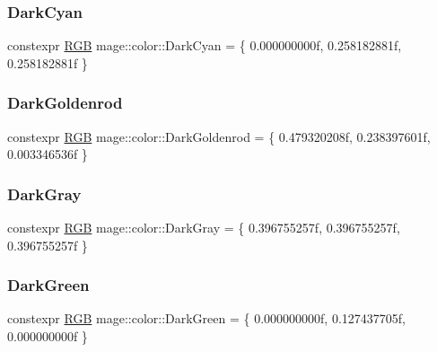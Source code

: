 \subsubsection{\texorpdfstring{Dark\+Cyan}{DarkCyan}}
{\footnotesize\ttfamily constexpr \hyperlink{structmage_1_1_r_g_b}{R\+GB} mage\+::color\+::\+Dark\+Cyan = \{ 0.\+000000000f, 0.\+258182881f, 0.\+258182881f \}}

\hypertarget{namespacemage_1_1color_a50ec8ddc7d55e5286b0b2f01ab690b2b}{}\label{namespacemage_1_1color_a50ec8ddc7d55e5286b0b2f01ab690b2b} 
\subsubsection{\texorpdfstring{Dark\+Goldenrod}{DarkGoldenrod}}
{\footnotesize\ttfamily constexpr \hyperlink{structmage_1_1_r_g_b}{R\+GB} mage\+::color\+::\+Dark\+Goldenrod = \{ 0.\+479320208f, 0.\+238397601f, 0.\+003346536f \}}

\hypertarget{namespacemage_1_1color_abe66674f72bdb34922b39b4ed1892159}{}\label{namespacemage_1_1color_abe66674f72bdb34922b39b4ed1892159} 
\subsubsection{\texorpdfstring{Dark\+Gray}{DarkGray}}
{\footnotesize\ttfamily constexpr \hyperlink{structmage_1_1_r_g_b}{R\+GB} mage\+::color\+::\+Dark\+Gray = \{ 0.\+396755257f, 0.\+396755257f, 0.\+396755257f \}}

\hypertarget{namespacemage_1_1color_a810f271efcbd9574bec9076a18c30476}{}\label{namespacemage_1_1color_a810f271efcbd9574bec9076a18c30476} 
\subsubsection{\texorpdfstring{Dark\+Green}{DarkGreen}}
{\footnotesize\ttfamily constexpr \hyperlink{structmage_1_1_r_g_b}{R\+GB} mage\+::color\+::\+Dark\+Green = \{ 0.\+000000000f, 0.\+127437705f, 0.\+000000000f \}}

\hypertarget{namespacemage_1_1color_a1673eb9031256e1ba8f8438168803eef}{}\label{namespacemage_1_1color_a1673eb9031256e1ba8f8438168803eef} 
